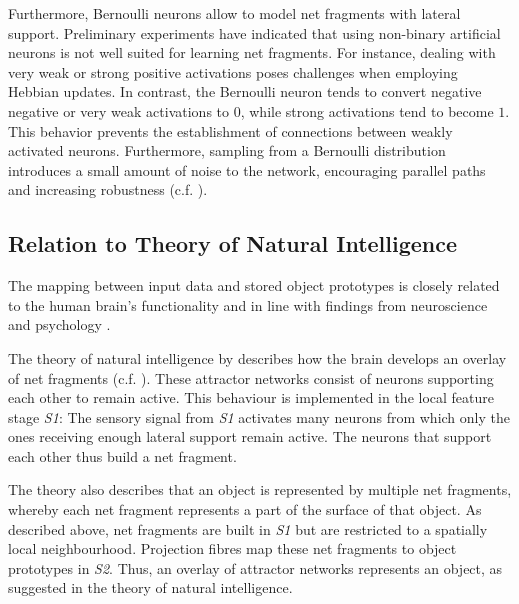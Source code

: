 Furthermore,  Bernoulli neurons allow to model net fragments with lateral support. Preliminary experiments have indicated that using non-binary artificial neurons is not well suited for learning net fragments. For instance, dealing with very weak or strong positive activations poses challenges when employing Hebbian updates. In contrast, the Bernoulli neuron tends to convert negative negative or very weak activations to $0$, while strong activations tend to become $1$. This behavior prevents the establishment of connections between weakly activated neurons. Furthermore, sampling from a Bernoulli distribution introduces a small amount of noise to the network, encouraging parallel paths and increasing robustness (c.f. ).



\subsection{Relation to Theory of Natural Intelligence}
The mapping between input data and stored object prototypes is closely related to the human brain's functionality and in line with findings from neuroscience \cite{kandel_principles_2013, olshausen_emergence_1996, vogels_inhibitory_2011, payeur_burst-dependent_2021} and psychology \cite{ellis_source_1938, kohler_gestalt_1992, wagemans_century_2012, hamlyn_psychology_2017}.

The theory of natural intelligence by  describes how the brain develops an overlay of net fragments (c.f. ). These attractor networks consist of neurons supporting each other to remain active.
This behaviour is implemented in the local feature stage \emph{S1}: The sensory signal from \emph{S1} activates many neurons from which only the ones receiving enough lateral support remain active. The neurons that support each other thus build a net fragment.

The theory also describes that an object is represented by multiple net fragments, whereby each net fragment represents a part of the surface of that object.
As described above, net fragments are built in \emph{S1} but are restricted to a spatially local neighbourhood. Projection fibres map these net fragments to object prototypes in \emph{S2}. Thus, an overlay of attractor networks represents an object, as suggested in the theory of natural intelligence.

